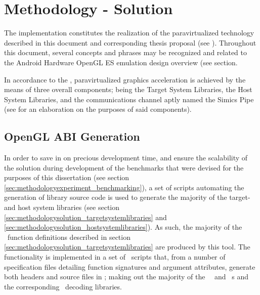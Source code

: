 
\chapter{Methodology - Solution}
\label{cha:methodologysolution}
The implementation constitutes the realization of the paravirtualized technology described in this document and corresponding thesis proposal (see ).
Throughout this document, several concepts and phrases may be recognized and related to the Android Hardware OpenGL ES emulation design overview (see section.

In accordance to the \dvttermreferencesolution , paravirtualized graphics acceleration is achieved by the means of three overall components; being the Target System Libraries, the Host System Libraries, and the communications channel aptly named the Simics Pipe (see  for an elaboration on the purposes of said components).



\section{OpenGL ABI Generation}
\label{sec:methodologysolution_openglabigeneration}
In order to save in on precious development time, and ensure the scalability of the solution during development of the benchmarks that were devised for the purposes of this dissertation (see section \ref{sec:methodologyexperiment_benchmarking}), a set of scripts automating the generation of library source code is used to generate the majority of the target- and host system libraries (see section \ref{sec:methodologysolution_targetsystemlibraries} and \ref{sec:methodologysolution_hostsystemlibraries}).
As such, the majority of the \dvttermopengl\ function definitions described in section \ref{sec:methodologysolution_targetsystemlibraries} are produced by this tool.
The functionality is implemented in a set of \dvttermpython\ scripts that, from a number of specification files detailing function signatures and argument attributes, generate both headers and source files in \dvttermc ; making out the majority of the \dvttermtarget\ \dvttermopengl\ and \dvttermegl\ \dvttermabi s and the corresponding \dvttermhost\ decoding libraries.

